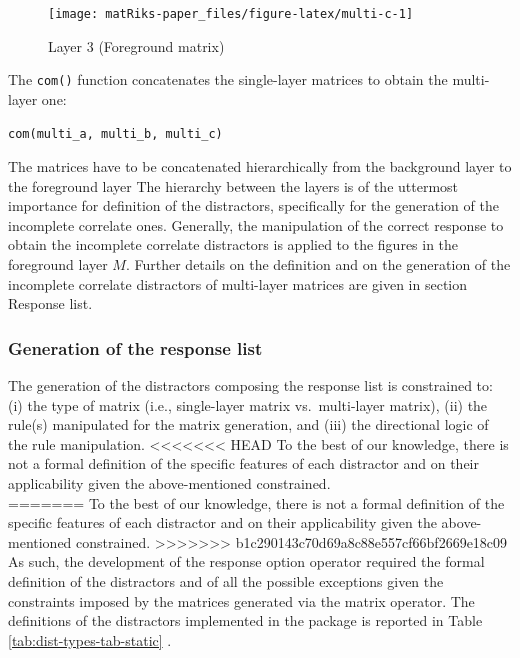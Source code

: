 \begin{figure}
\texttt{[image: matRiks-paper\_files/figure-latex/multi-c-1]} \caption{Layer 3 (Foreground matrix)}\label{fig:multi-c}
\end{figure}

The \texttt{com()} function concatenates the single-layer matrices to obtain the multi-layer one:

\begin{verbatim}
com(multi_a, multi_b, multi_c)
\end{verbatim}

The matrices have to be concatenated hierarchically from the background layer to the foreground layer
The hierarchy between the layers is of the uttermost importance for definition of the distractors, specifically for the generation of the incomplete correlate ones. Generally, the manipulation of the correct response to obtain the incomplete correlate distractors is applied to the figures in the foreground layer \(M\). Further details on the definition and on the generation of the incomplete correlate distractors of multi-layer matrices are given in section Response list.

\subsubsection{Generation of the response list}\label{generation-of-the-response-list}

The generation of the distractors composing the response list is constrained to: (i) the type of matrix (i.e., single-layer matrix vs.~multi-layer matrix), (ii) the rule(s) manipulated for the matrix generation, and (iii) the directional logic of the rule manipulation.
<<<<<<< HEAD
To the best of our knowledge, there is not a formal definition of the specific features of each distractor and on their applicability given the above-mentioned constrained.\\
=======
To the best of our knowledge, there is not a formal definition of the specific features of each distractor and on their applicability given the above-mentioned constrained.
>>>>>>> b1c290143c70d69a8c88e557cf66bf2669e18c09
As such, the development of the response option operator required the formal definition of the distractors and of all the possible exceptions given the constraints imposed by the matrices generated via the matrix operator.
The definitions of the distractors implemented in the  package is reported in Table \ref{tab:dist-types-tab-static} .

